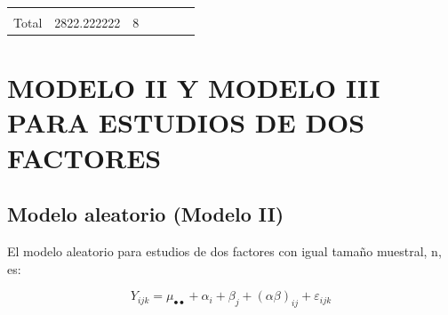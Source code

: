 \documentclass[]{book}
\theoremstyle{definition}
\theoremstyle{definition}
\theoremstyle{definition}
\theoremstyle{remark}
\begin{document}
\begin{longtable}[]{@{}lllllll@{}}
\begin{minipage}[t]{0.15\columnwidth}
\strut
\end{minipage} & \begin{minipage}[t]{0.06\columnwidth}\raggedright
\strut
\end{minipage} & \begin{minipage}[t]{0.08\columnwidth}\raggedright
\strut
\end{minipage} & \begin{minipage}[t]{0.13\columnwidth}\raggedright
\strut
\end{minipage}\tabularnewline
\begin{minipage}[t]{0.15\columnwidth}\raggedright
Total\strut
\end{minipage} & \begin{minipage}[t]{0.11\columnwidth}\raggedright
2822.222222\strut
\end{minipage} & \begin{minipage}[t]{0.12\columnwidth}\raggedright
8\strut
\end{minipage} & \begin{minipage}[t]{0.15\columnwidth}\raggedright
\strut
\end{minipage} & \begin{minipage}[t]{0.06\columnwidth}\raggedright
\strut
\end{minipage} & \begin{minipage}[t]{0.08\columnwidth}\raggedright
\strut
\end{minipage} & \begin{minipage}[t]{0.13\columnwidth}\raggedright
\strut
\end{minipage}\tabularnewline
\bottomrule
\end{longtable}

\hypertarget{modelo-ii-y-modelo-iii-para-estudios-de-dos-factores}{%
\section{MODELO II Y MODELO III PARA ESTUDIOS DE DOS
FACTORES}\label{modelo-ii-y-modelo-iii-para-estudios-de-dos-factores}}

\hypertarget{modelo-aleatorio-modelo-ii}{%
\subsection{Modelo aleatorio (Modelo
II)}\label{modelo-aleatorio-modelo-ii}}

El modelo aleatorio para estudios de dos factores con igual tamaño
muestral, n, es:

\[
Y_{ijk} = \mu_{\bullet \bullet} + \alpha_{i} + \beta_{j} + \left( \alpha\beta \right)_{ij} + \varepsilon_{ijk}
\]
\end{document}
